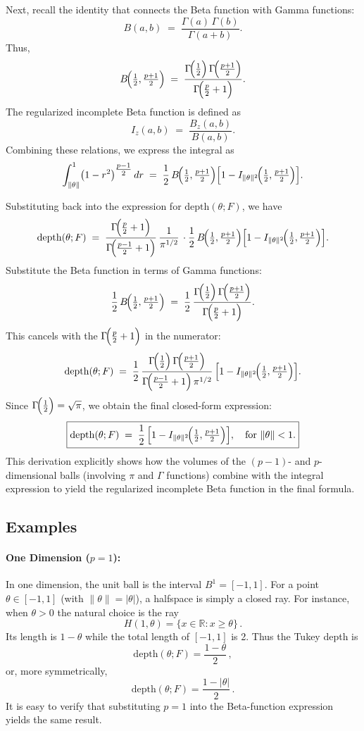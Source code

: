 Next, recall the identity that connects the Beta function with Gamma functions:
\[
B(a,b)
\;=\;
\frac{\Gamma(a)\,\Gamma(b)}{\Gamma(a+b)}.
\]
Thus,
\[
B\!\Bigl(\tfrac{1}{2},\tfrac{p+1}{2}\Bigr)
\;=\;
\frac{\Gamma\!\Bigl(\tfrac{1}{2}\Bigr)\,\Gamma\!\Bigl(\tfrac{p+1}{2}\Bigr)}
{\Gamma\!\Bigl(\tfrac{p}{2}+1\Bigr)}.
\]
The regularized incomplete Beta function is defined as
\[
I_{z}(a,b)
\;=\;
\frac{B_{z}(a,b)}{B(a,b)}.
\]
Combining these relations, we express the integral as
\[
\int_{\|\theta\|}^{1}
\bigl(1 - r^2\bigr)^{\tfrac{p-1}{2}}\,dr
\;=\;
\frac{1}{2}\,
B\!\Bigl(\tfrac{1}{2},\tfrac{p+1}{2}\Bigr)
\Bigl[
1 - I_{\|\theta\|^2}\!\Bigl(\tfrac{1}{2},\tfrac{p+1}{2}\Bigr)
\Bigr].
\]

Substituting back into the expression for \(\mathrm{depth}(\theta;F)\), we have
\[
\mathrm{depth}(\theta;F)
\;=\;
\frac{\Gamma\!\Bigl(\tfrac{p}{2}+1\Bigr)}{\Gamma\!\Bigl(\tfrac{p-1}{2}+1\Bigr)}\,
\frac{1}{\pi^{1/2}}\,
\cdot
\frac{1}{2}\,
B\!\Bigl(\tfrac{1}{2},\tfrac{p+1}{2}\Bigr)
\Bigl[
1 - I_{\|\theta\|^2}\!\Bigl(\tfrac{1}{2},\tfrac{p+1}{2}\Bigr)
\Bigr].
\]
Substitute the Beta function in terms of Gamma functions:
\[
\frac{1}{2}\,
B\!\Bigl(\tfrac{1}{2},\tfrac{p+1}{2}\Bigr)
\;=\;
\frac{1}{2}\,
\frac{\Gamma\!\Bigl(\tfrac{1}{2}\Bigr)\,\Gamma\!\Bigl(\tfrac{p+1}{2}\Bigr)}
{\Gamma\!\Bigl(\tfrac{p}{2}+1\Bigr)}.
\]
This cancels with the \(\Gamma\!\Bigl(\tfrac{p}{2}+1\Bigr)\) in the numerator:
\[
\mathrm{depth}(\theta;F)
\;=\;
\frac{1}{2}\,
\frac{\Gamma\!\Bigl(\tfrac{1}{2}\Bigr)\,\Gamma\!\Bigl(\tfrac{p+1}{2}\Bigr)}
{\Gamma\!\Bigl(\tfrac{p-1}{2}+1\Bigr)\,\pi^{1/2}}\,
\Bigl[
1 - I_{\|\theta\|^2}\!\Bigl(\tfrac{1}{2},\tfrac{p+1}{2}\Bigr)
\Bigr].
\]
Since \(\Gamma\!\Bigl(\tfrac{1}{2}\Bigr)=\sqrt{\pi}\), we obtain the final closed-form expression:
\[
\boxed{
\mathrm{depth}(\theta;F)
\;=\;
\frac{1}{2}\,
\Bigl[
1 - I_{\|\theta\|^2}\!\Bigl(\tfrac{1}{2},\tfrac{p+1}{2}\Bigr)
\Bigr],
\quad \text{for } \|\theta\|<1.
}
\]
This derivation explicitly shows how the volumes of the \((p-1)\)- and \(p\)-dimensional balls (involving \(\pi\) and \(\Gamma\) functions) combine with the integral expression to yield the regularized incomplete Beta function in the final formula.


\subsection{Examples}

\paragraph{One Dimension (\(p=1\)):}  
In one dimension, the unit ball is the interval \(B^1 = [-1,1]\). For a point \(\theta\in[-1,1]\) (with \(\|\theta\|=|\theta|\)), a halfspace is simply a closed ray. For instance, when \(\theta>0\) the natural choice is the ray
\[
H(1,\theta)=\{x \in \mathbb{R}: x\ge \theta\}\,.
\]
Its length is \(1-\theta\) while the total length of \([-1,1]\) is 2. Thus the Tukey depth is
\[
\mathrm{depth}(\theta;F)
=\frac{1-\theta}{2}\,,
\]
or, more symmetrically,
\[
\mathrm{depth}(\theta;F)
=\frac{1-|\theta|}{2}\,.
\]
It is easy to verify that substituting \(p=1\) into the Beta-function expression yields the same result.